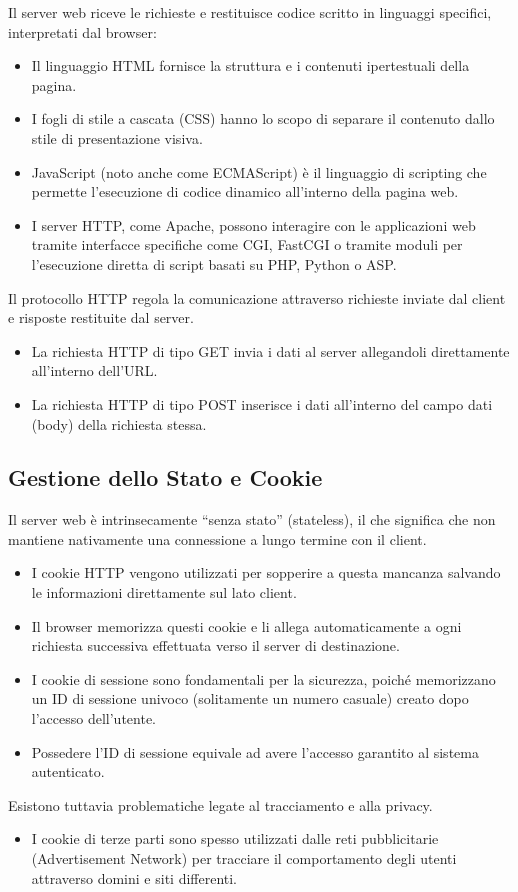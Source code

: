 \documentclass{article}
\begin{document}
Il server web riceve le richieste e restituisce codice scritto in linguaggi specifici, interpretati dal browser:
\begin{itemize}
    \item Il linguaggio HTML fornisce la struttura e i contenuti ipertestuali della pagina.
    \item I fogli di stile a cascata (CSS) hanno lo scopo di separare il contenuto dallo stile di presentazione visiva.
    \item JavaScript (noto anche come ECMAScript) è il linguaggio di scripting che permette l'esecuzione di codice dinamico all'interno della pagina web.
    \item I server HTTP, come Apache, possono interagire con le applicazioni web tramite interfacce specifiche come CGI, FastCGI o tramite moduli per l'esecuzione diretta di script basati su PHP, Python o ASP.
\end{itemize}

Il protocollo HTTP regola la comunicazione attraverso richieste inviate dal client e risposte restituite dal server.
\begin{itemize}
    \item La richiesta HTTP di tipo GET invia i dati al server allegandoli direttamente all'interno dell'URL.
    \item La richiesta HTTP di tipo POST inserisce i dati all'interno del campo dati (body) della richiesta stessa.
\end{itemize}

\subsection{Gestione dello Stato e Cookie}
Il server web è intrinsecamente ``senza stato'' (stateless), il che significa che non mantiene nativamente una connessione a lungo termine con il client.
\begin{itemize}
    \item I cookie HTTP vengono utilizzati per sopperire a questa mancanza salvando le informazioni direttamente sul lato client.
    \item Il browser memorizza questi cookie e li allega automaticamente a ogni richiesta successiva effettuata verso il server di destinazione.
    \item I cookie di sessione sono fondamentali per la sicurezza, poiché memorizzano un ID di sessione univoco (solitamente un numero casuale) creato dopo l'accesso dell'utente.
    \item Possedere l'ID di sessione equivale ad avere l'accesso garantito al sistema autenticato.
\end{itemize}
Esistono tuttavia problematiche legate al tracciamento e alla privacy.
\begin{itemize}
    \item I cookie di terze parti sono spesso utilizzati dalle reti pubblicitarie (Advertisement Network) per tracciare il comportamento degli utenti attraverso domini e siti differenti.
\end{itemize}
\end{document}
